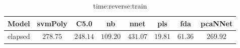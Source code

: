 \begin{table}[!ht]
	\centering
	\begin{tabular}{|c|c|c|c|c|c|c|c|}
		\hline
		Model & svmPoly & C5.0 & nb & nnet & pls & fda & pcaNNet \\ \hline
		elapsed & $278.75$ & $248.14$ & $109.20$ & $431.07$ & $19.81$ & $61.36$ & $269.92$ \\ \hline
	\end{tabular}
	\caption{time:reverse:train}
	\label{tab:time:reverse:train}
\end{table}
